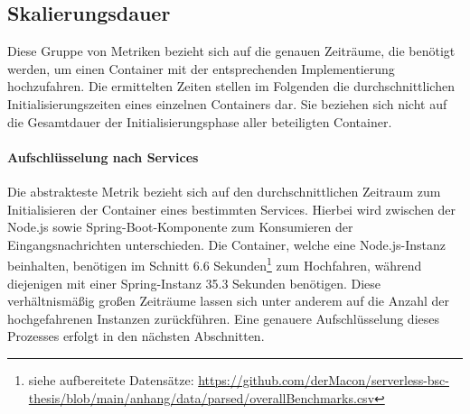 \subsection{Skalierungsdauer}
Diese Gruppe von Metriken bezieht sich auf die genauen Zeiträume, die benötigt werden, um einen Container mit der entsprechenden Implementierung hochzufahren. Die ermittelten Zeiten stellen im Folgenden die durchschnittlichen Initialisierungszeiten eines einzelnen Containers dar. Sie beziehen sich nicht auf die Gesamtdauer der Initialisierungsphase aller beteiligten Container.


\paragraph{Aufschlüsselung nach Services}
Die abstrakteste Metrik bezieht sich auf den durchschnittlichen Zeitraum zum Initialisieren der Container eines bestimmten Services. Hierbei wird zwischen der Node.js sowie Spring-Boot-Komponente zum Konsumieren der Eingangsnachrichten unterschieden. Die Container, welche eine Node.js-Instanz beinhalten, benötigen im Schnitt 6.6 Sekunden\footnote{siehe aufbereitete Datensätze: \url{https://github.com/derMacon/serverless-bsc-thesis/blob/main/anhang/data/parsed/overallBenchmarks.csv}} zum Hochfahren, während diejenigen mit einer Spring-Instanz 35.3 Sekunden benötigen. Diese verhältnismäßig großen Zeiträume lassen sich unter anderem auf die Anzahl der hochgefahrenen Instanzen zurückführen. Eine genauere Aufschlüsselung dieses Prozesses erfolgt in den nächsten Abschnitten.

